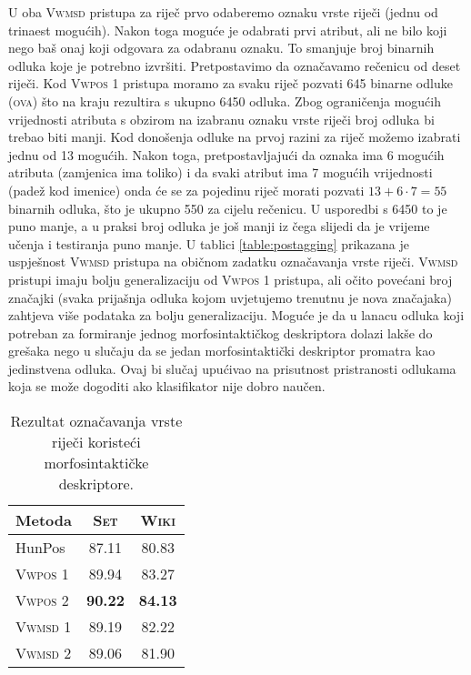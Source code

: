 U oba \textsc{Vwmsd} pristupa za riječ prvo odaberemo oznaku vrste riječi (jednu
od trinaest mogućih). Nakon toga moguće je odabrati prvi atribut, ali ne bilo
koji nego baš onaj koji odgovara za odabranu oznaku. To smanjuje broj binarnih
odluka koje je potrebno izvršiti. Pretpostavimo da označavamo rečenicu od deset
riječi. Kod \textsc{Vwpos 1} pristupa moramo za svaku riječ pozvati 645 binarne
odluke (\textsc{ova}) što na kraju rezultira s ukupno 6450 odluka. Zbog
ograničenja mogućih vrijednosti atributa s obzirom na izabranu oznaku vrste
riječi broj odluka bi trebao biti manji. Kod donošenja odluke na prvoj razini za
riječ možemo izabrati jednu od 13 mogućih. Nakon toga, pretpostavljajući da
oznaka ima 6 mogućih atributa (zamjenica ima toliko) i da svaki atribut ima 7
mogućih vrijednosti (padež kod imenice) onda će se za pojedinu riječ morati
pozvati $13+6 \cdot 7 = 55$ binarnih odluka, što je ukupno 550 za cijelu
rečenicu. U usporedbi s 6450 to je puno manje, a u praksi broj odluka je još
manji iz čega slijedi da je vrijeme učenja i testiranja puno manje. U tablici
\ref{table:postagging} prikazana je uspješnost \textsc{Vwmsd} pristupa na
običnom zadatku označavanja vrste riječi. \textsc{Vwmsd} pristupi imaju bolju
generalizaciju od \textsc{Vwpos 1} pristupa, ali očito povećani broj značajki
(svaka prijašnja odluka kojom uvjetujemo trenutnu je nova značajaka) zahtjeva
više podataka za bolju generalizaciju. Moguće je da u lanacu odluka koji
potreban za formiranje jednog morfosintaktičkog deskriptora dolazi lakše do
grešaka nego u slučaju da se jedan morfosintaktički deskriptor promatra kao
jedinstvena odluka. Ovaj bi slučaj upućivao na prisutnost pristranosti odlukama
koja se može dogoditi ako klasifikator nije dobro naučen.

\begin{table}[]
\centering
\caption{Rezultat označavanja vrste riječi koristeći morfosintaktičke
deskriptore.}
\label{table:msdtagging}
\begin{tabular}{|l|c|c|}
\hline
Metoda             & \textsc{Set}   & \textsc{Wiki}  \\ \hline \hline
HunPos             & 87.11          & 80.83          \\
\textsc{Vwpos 1}   & 89.94          & 83.27          \\
\textsc{Vwpos 2}   & \textbf{90.22} & \textbf{84.13} \\
\textsc{Vwmsd 1}   & 89.19          & 82.22          \\
\textsc{Vwmsd 2}   & 89.06          & 81.90          \\ \hline
\end{tabular}
\end{table}
